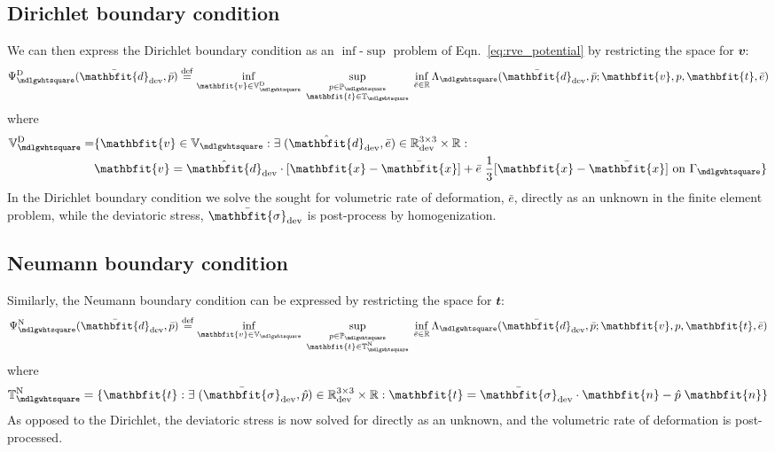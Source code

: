 \documentclass[notitlepage,a4paper,fleqn,9pt]{extarticle}
\renewcommand{\ta}[1]{\mathbfit{#1}}
\renewcommand{\ts}[1]{\mathbfit{#1}}
\renewcommand{\Box}{\mdlgwhtsquare}
\begin{document}
\begin{multicols}{2}
\subsection{Dirichlet boundary condition}
We can then express the Dirichlet boundary condition as an $\inf$-$\sup$ problem of Eqn.~\eqref{eq:rve_potential} by restricting the space for $\ta v$:
\begin{align}
\label{eq:dirichlet_potential}
 \Psi^\Dirichlet_\Box(\bar{\ts d}_\dev, \bar{p} ) \defeq
    \inf_{\ta v \in \set V_\Box^\Dirichlet } \;
    \sup_{\substack{ p\in \set P_\Box \\ \ta t \in \set{T}_\Box }} \;
    \inf_{\bar{e} \in \set{R}}
    \Lambda_\Box(\bar{\ts d}_\dev, \bar{p}; \ta v, p, \ta t, \bar{e})
\end{align}
where
\begin{align}
 \set{V}_\Box^\Dirichlet =& \{ \ta v \in \set{V}_\Box : \exists\; (\hat{\ts d}_\dev,\bar{e}) \in \set{R}^{3\times 3}_\dev \times \set{R} :
\nonumber\\
  & \ta v = \hat{\ts d}_\dev\cdot[\ta x - \bar{\ta x}] + \bar{e}\;\frac13 [\ta x - \bar{\ta x}] \text{ on }\Gamma_\Box \}
\end{align}
In the Dirichlet boundary condition we solve the sought for volumetric rate of deformation, $\bar{e}$, directly as an unknown in the finite element problem, while the deviatoric stress, $\bar{\ts\sigma}_\dev$ is post-process by homogenization.

\subsection{Neumann boundary condition}
Similarly, the Neumann boundary condition can be expressed by restricting the space for $\ta t$:
\begin{align}
 \Psi^\Neumann_\Box(\bar{\ts d}_\dev, \bar{p} ) \defeq
    \inf_{\ta v \in \set V_\Box } \;
    \sup_{\substack{p\in \set P_\Box \\ \ta t \in \set T_\Box^\Neumann }} \;
    \inf_{\bar{e} \in \set{R} }
    \Lambda_\Box(\bar{\ts d}_\dev, \bar p; \ta v, p, \ta t, \bar{e})
\end{align}
where
\begin{align}
 \set T_\Box^\Neumann = \{ \ta t : \exists\; (\bar{\ts\sigma}_\dev, \hat{p}) \in \set{R}^{3\times 3}_\dev \times \set{R} : \ta t = \bar{\ts\sigma}_\dev\cdot\ta n - \hat{p}\;\ta n \}
\end{align}
As opposed to the Dirichlet, the deviatoric stress is now solved for directly as an unknown, and the volumetric rate of deformation is post-processed.




\end{multicols}
\end{document}
